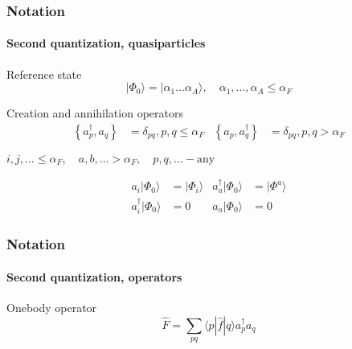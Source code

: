 \documentclass[compress]{beamer}
\newcommand*{\ket}[1]{|#1\rangle}
\newcommand*{\bra}[1]{\langle#1|}
\newcommand{\element}[3]
        {\bra{#1}#2\ket{#3}}
\begin{document}
\begin{frame}[fragile]
    \frametitle{Notation}
    \framesubtitle{Second quantization, quasiparticles}
    \begin{block}{Reference state}
        \begin{equation*}
            \ket{\Phi_0} = \ket{\alpha_1 \dots \alpha_A}, \quad \alpha_1, \dots, \alpha_A \leq \alpha_F
        \end{equation*}
    \end{block}
        
    \begin{block}{Creation and annihilation operators}
    \begin{align*}
        \left\{a_p^\dagger, a_q \right\}&= \delta_{pq}, p, q \leq \alpha_F & 
            \left\{a_p, a_q^\dagger \right\} &= \delta_{pq}, p, q > \alpha_F
    \end{align*}
        \begin{center}
        $i,j,\ldots \leq \alpha_F, \quad a,b,\ldots > \alpha_F, \quad p,q, \ldots - \textrm{any}$
        \end{center}
    \begin{align*}
        a_i\ket{\Phi_0} &= \ket{\Phi_i} & a_a^\dagger\ket{\Phi_0} &= \ket{\Phi^a} \\
        a_i^\dagger\ket{\Phi_0} &= 0 & a_a\ket{\Phi_0} &= 0
    \end{align*}
    \end{block}
            
\end{frame}
        
\begin{frame}[fragile]
    \frametitle{Notation}
    \framesubtitle{Second quantization, operators}
        \small
    \begin{block}{Onebody operator}
        \begin{equation*}
            \hat{F} = \sum_{pq} \element{p}{\hat{f}}{q} a_p^\dagger a_q
        \end{equation*}
    \end{block}
\end{frame}
\end{document}
